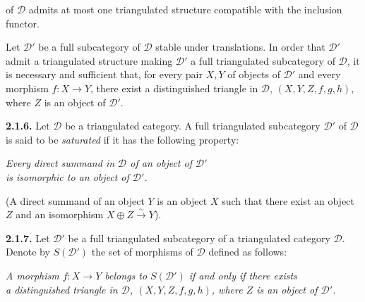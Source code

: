 \clearpage
{}%
\begingroup
\small
\setlength{\emergencystretch}{1.5em}%
\setlength{\abovedisplayskip}{2pt plus 1pt minus 1pt}%
\setlength{\belowdisplayskip}{2pt plus 1pt minus 1pt}%

\noindent of $\mathcal D$ admits at most one triangulated structure compatible
with the inclusion functor.

Let $\mathcal D'$ be a full subcategory of $\mathcal D$ stable under
translations. In order that $\mathcal D'$ admit a triangulated structure
making $\mathcal D'$ a full triangulated subcategory of $\mathcal D$, it is
necessary and sufficient that, for every pair $X,Y$ of objects of
$\mathcal D'$ and every morphism $f\colon X\to Y$, there exist a distinguished
triangle in $\mathcal D$, $(X,Y,Z,f,g,h)$, where $Z$ is an object of
$\mathcal D'$.

\medskip
\noindent\textbf{2.1.6.}\quad
{}
Let $\mathcal D$ be a triangulated category. A full triangulated subcategory
$\mathcal D'$ of $\mathcal D$ is said to be \emph{saturated} if it has the
following property:

\par\smallskip
\noindent{}%
\begin{minipage}[t]{\linewidth}
  \centering\itshape
  Every direct summand in $\mathcal D$ of an object of $\mathcal D'$\\[-1pt]
  is isomorphic to an object of $\mathcal D'$.
\end{minipage}
\par\smallskip

\noindent (A direct summand of an object $Y$ is an object $X$ such that there
exist an object $Z$ and an isomorphism $X\oplus Z\xrightarrow{\sim}Y$).

\medskip
\noindent\textbf{2.1.7.}\quad
{}
Let $\mathcal D'$ be a full triangulated subcategory of a triangulated
category $\mathcal D$. Denote by $S(\mathcal D')$ the set of morphisms of
$\mathcal D$ defined as follows:

\par\smallskip
\noindent{}%
\begin{minipage}[t]{\linewidth}
  \centering\itshape
  A morphism $f\colon X\to Y$ belongs to $S(\mathcal D')$ if and only if there exists\\[-1pt]
  a distinguished triangle in $\mathcal D$, $(X,Y,Z,f,g,h)$, where $Z$ is an object of $\mathcal D'$.
\end{minipage}
\par\smallskip


